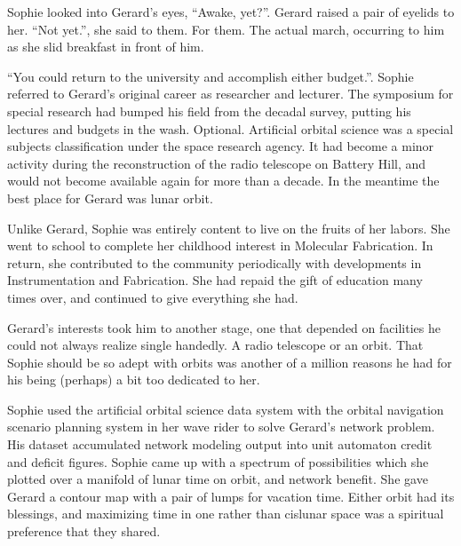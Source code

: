 Sophie looked into Gerard's eyes, ``Awake, yet?''.  Gerard raised a
pair of eyelids to her.  ``Not yet.'', she said to them.  For them.
The actual march, occurring to him as she slid breakfast in front of
him.



``You could return to the university and accomplish either budget.''.
Sophie referred to Gerard's original career as researcher and
lecturer.  The symposium for special research had bumped his field
from the decadal survey, putting his lectures and budgets in the wash.
Optional.  Artificial orbital science was a special subjects
classification under the space research agency.  It had become a minor
activity during the reconstruction of the radio telescope on Battery
Hill, and would not become available again for more than a decade.  In
the meantime the best place for Gerard was lunar orbit.



Unlike Gerard, Sophie was entirely content to live on the fruits of
her labors.  She went to school to complete her childhood interest in
Molecular Fabrication.  In return, she contributed to the community
periodically with developments in Instrumentation and Fabrication.
She had repaid the gift of education many times over, and continued to
give everything she had.

Gerard's interests took him to another stage, one that depended on
facilities he could not always realize single handedly.  A radio
telescope or an orbit.  That Sophie should be so adept with orbits was
another of a million reasons he had for his being (perhaps) a bit too
dedicated to her.



Sophie used the artificial orbital science data system with the
orbital navigation scenario planning system in her wave rider to solve
Gerard's network problem.  His dataset accumulated network modeling
output into unit automaton credit and deficit figures.  Sophie came up
with a spectrum of possibilities which she plotted over a manifold of
lunar time on orbit, and network benefit.  She gave Gerard a contour
map with a pair of lumps for vacation time.  Either orbit had its
blessings, and maximizing time in one rather than cislunar space was
a spiritual preference that they shared.  



